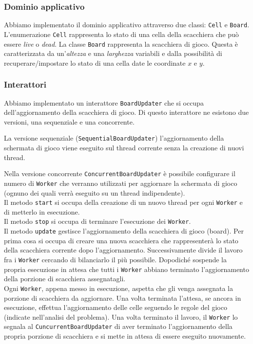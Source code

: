 \documentclass[a4paper]{article}
\begin{document}
\subsubsection{Dominio applicativo}\label{dominio-applicativo}

Abbiamo implementato il dominio applicativo attraverso due classi:
\texttt{Cell} e \texttt{Board}.\\
L'enumerazione \texttt{Cell} rappresenta lo stato di una cella della scacchiera che può essere \textit{live} o \textit{dead}.
La classe \texttt{Board} rappresenta la scacchiera di gioco. Questa è caratterizzata da un'\textit{altezza} e una \textit{larghezza} variabili e dalla possibilità di recuperare/impostare lo stato di una cella date le coordinate $x$ e $y$.

\subsubsection{Interattori}\label{interattori}

Abbiamo implementato un interattore \texttt{BoardUpdater} che si occupa dell'aggiornamento della scacchiera di gioco. Di questo interattore ne esistono due versioni, una sequenziale e una concorrente.

La versione sequenziale (\texttt{SequentialBoardUpdater}) l'aggiornamento della schermata di gioco viene eseguito sul thread corrente senza la creazione di nuovi thread.

Nella versione concorrente \texttt{ConcurrentBoardUpdater} è possibile configurare il numero di \texttt{Worker} che verranno utilizzati per aggiornare la schermata di gioco (ognuno dei quali verrà eseguito su un thread indipendente).\\
Il metodo \texttt{start} si occupa della creazione di un nuovo thread per ogni \texttt{Worker} e di metterlo in esecuzione.\\
Il metodo \texttt{stop} si occupa di terminare l'esecuzione dei \texttt{Worker}.\\
Il metodo \texttt{update} gestisce l'aggiornamento della scacchiera di gioco (board). Per prima cosa si occupa di creare una nuova scacchiera che rappresenterà lo stato della scacchiera corrente dopo l'aggiornamento. Successivamente divide il lavoro fra i \texttt{Worker} cercando di bilanciarlo il più possibile. Dopodiché sospende la propria esecuzione in attesa che tutti i \texttt{Worker} abbiano terminato l'aggiornamento della porzione di scacchiera assegnatagli.\\
Ogni \texttt{Worker}, appena messo in esecuzione, aspetta che gli venga assegnata la porzione di scacchiera da aggiornare. Una volta terminata l'attesa, se ancora in esecuzione, effettua l'aggiornamento delle celle seguendo le regole del gioco (indicate nell'analisi del problema). Una volta terminato il lavoro, il \texttt{Worker} lo segnala al \texttt{CuncurrentBoardUpdater} di aver terminato l'aggiornamento della propria porzione di scacchiera e si mette in attesa di essere eseguito nuovamente.
\end{document}
